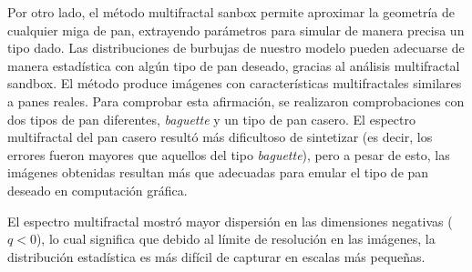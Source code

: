 Por otro lado, el método multifractal sanbox permite aproximar la geometría de cualquier miga de pan, extrayendo parámetros para simular de manera precisa un tipo dado.
Las distribuciones de burbujas de nuestro modelo pueden adecuarse de manera estadística con algún tipo de pan deseado, gracias al análisis multifractal sandbox.
El método produce imágenes con características multifractales similares a panes reales.
Para comprobar esta afirmación, se realizaron comprobaciones con dos tipos de pan diferentes, {\em baguette} y un tipo de pan casero.
El espectro multifractal del pan casero resultó más dificultoso de sintetizar (es decir, los errores fueron mayores que aquellos del tipo {\em baguette}), pero a pesar de esto, las imágenes obtenidas resultan más que adecuadas para emular el tipo de pan deseado en computación gráfica.

El espectro multifractal mostró mayor dispersión en las dimensiones negativas ($q < 0$), 
lo cual significa que debido al límite de resolución en las imágenes, la distribución estadística es más difícil de capturar en escalas más pequeñas.







